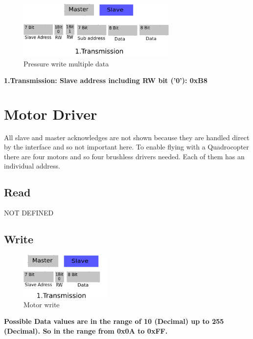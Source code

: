 \begin{figure}[H]
	\centering\includegraphics[width=0.7\textwidth]{fig/ACC_write_multiple}
	\caption{Pressure write multiple data}
	\label{fig:Pressure4}
\end{figure}

\textbf{1.Transmission: Slave address including RW bit ('0'): 0xB8}

\section{Motor Driver}
\label{sec:ADC}

All slave and master acknowledges are not shown because they are handled direct by the interface and so not important here. To enable flying with a Quadrocopter there are four motors and so four brushless drivers needed. Each of them has an individual address.


\subsection{Read}
\label{subsec:Motorread}

NOT DEFINED	

\subsection{Write}
\label{subsec:Motorwrite}

\begin{figure}[H]
	\centering\includegraphics[width=0.4\textwidth]{fig/Motor_write}
	\caption{Motor write}
	\label{fig:Motor}
\end{figure}



\textbf{Possible Data values are in the range of 10 (Decimal) up to 255 (Decimal). So in the range from 0x0A to 0xFF.}